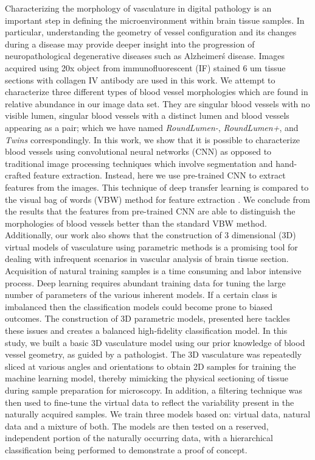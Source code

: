 Characterizing the morphology of vasculature in digital pathology is an important step in defining the microenvironment within brain tissue samples. In particular, understanding the geometry of vessel configuration and its changes during a disease may provide deeper insight into the progression of neuropathological degenerative diseases such as Alzheimer\'s disease. Images acquired using 20x object from immunofluorescent (IF) stained 6 um tissue sections with collagen IV antibody are used in this work.  We attempt to characterize three different types of blood vessel morphologies which are found in relative abundance in our image data set. They are singular blood vessels with no visible lumen, singular blood vessels with a distinct lumen and blood vessels appearing as a pair; which we have named \textit{RoundLumen-}, \textit{RoundLumen+}, and \textit{Twins} correspondingly.
In this work, we show that it is possible to characterize blood vessels using convolutional neural networks (CNN) as opposed to traditional image processing techniques which involve segmentation and hand-crafted feature extraction. Instead, here we use pre-trained CNN to extract features from the images. This technique of deep transfer learning is compared to the visual bag of words (VBW) method for feature extraction \cite{yang2007evaluating}. We conclude from the results that the features from pre-trained CNN are able to distinguish the morphologies of blood vessels better than the standard VBW method. 
Additionally, our work also shows that the construction of 3 dimensional (3D) virtual models of vasculature using parametric methods is a promising tool for dealing with infrequent scenarios in vascular analysis of brain tissue section. Acquisition of natural training samples is a time consuming and labor intensive process. Deep learning requires abundant training data for tuning the large number of parameters of the various inherent models. If a certain class is imbalanced then the classification models could become prone to biased outcomes. The construction of 3D parametric models, presented here tackles these issues and creates a balanced high-fidelity classification model. 
In this study, we built a basic 3D vasculature model using our prior knowledge of blood vessel geometry, as guided by a pathologist. The 3D vasculature was repeatedly sliced at various angles and orientations to obtain 2D samples for training the machine learning model, thereby mimicking the physical sectioning of tissue during sample preparation for microscopy. In addition, a filtering technique was then used to fine-tune the virtual data to reflect the variability present in the naturally acquired samples. We train three models based on: virtual data, natural data and a mixture of both. The models are then tested on a reserved, independent portion of the naturally occurring data, with a hierarchical classification being performed to demonstrate a proof of concept. 
